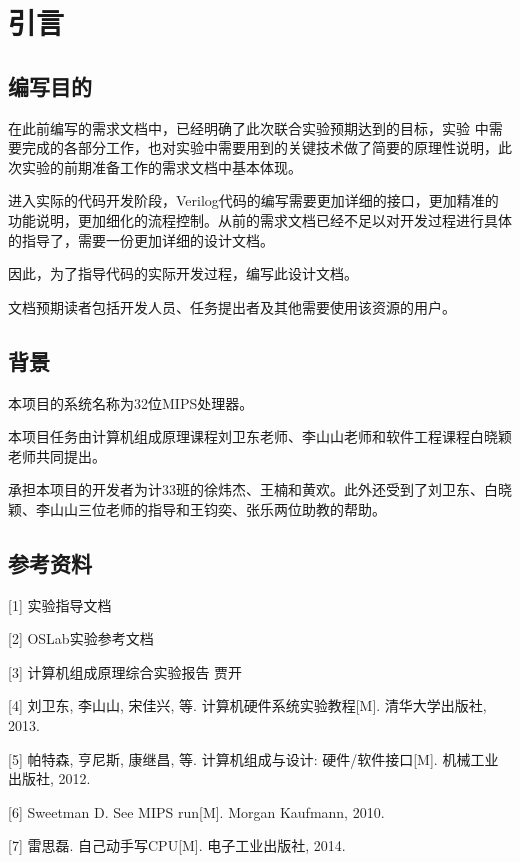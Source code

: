 \section{引言}
\subsection{编写目的}
在此前编写的需求文档中，已经明确了此次联合实验预期达到的目标，实验
中需要完成的各部分工作，也对实验中需要用到的关键技术做了简要的原理性说明，此次实验的前期准备工作的需求文档中基本体现。

进入实际的代码开发阶段，Verilog代码的编写需要更加详细的接口，更加精准的功能说明，更加细化的流程控制。从前的需求文档已经不足以对开发过程进行具体的指导了，需要一份更加详细的设计文档。

因此，为了指导代码的实际开发过程，编写此设计文档。

文档预期读者包括开发人员、任务提出者及其他需要使用该资源的用户。
\subsection{背景}
本项目的系统名称为32位MIPS处理器。

本项目任务由计算机组成原理课程刘卫东老师、李山山老师和软件工程课程白晓颖老师共同提出。

承担本项目的开发者为计33班的徐炜杰、王楠和黄欢。此外还受到了刘卫东、白晓颖、李山山三位老师的指导和王钧奕、张乐两位助教的帮助。
\subsection{参考资料}
[1] 实验指导文档

[2] OSLab实验参考文档

[3] 计算机组成原理综合实验报告 贾开

[4] 刘卫东, 李山山, 宋佳兴, 等. 计算机硬件系统实验教程[M]. 清华大学出版社, 2013.

[5] 帕特森, 亨尼斯, 康继昌, 等. 计算机组成与设计: 硬件/软件接口[M]. 机械工业出版社, 2012.

[6] Sweetman D. See MIPS run[M]. Morgan Kaufmann, 2010.

[7] 雷思磊. 自己动手写CPU[M]. 电子工业出版社, 2014.